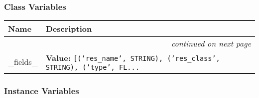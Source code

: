 
  \subsubsection{Class Variables}

    \vspace{-1cm}
\hspace{\varindent}\begin{longtable}{|p{\varnamewidth}|p{\vardescrwidth}|l}
\cline{1-2}
\cline{1-2} \centering \textbf{Name} & \centering \textbf{Description}& \\
\cline{1-2}
\endhead\cline{1-2}\multicolumn{3}{r}{\small\textit{continued on next page}}\\\endfoot\cline{1-2}
\endlastfoot\raggedright \_\-f\-i\-e\-l\-d\-s\-\_\- & \raggedright \textbf{Value:} 
{\tt [('res\_name', STRING), ('res\_class', STRING), ('type', FL\texttt{...}}&\\
\cline{1-2}
\end{longtable}



  \subsubsection{Instance Variables}

